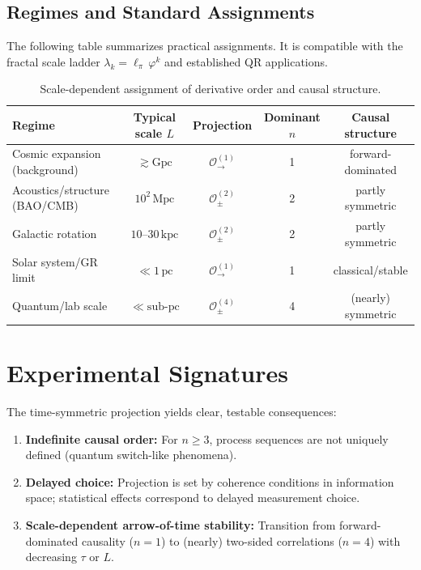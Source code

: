 \subsection{Regimes and Standard Assignments}
The following table summarizes practical assignments. It is compatible
with the fractal scale ladder \(\lambda_k=\ell_\pi\,\varphi^{k}\) and established QR applications.

\begin{table}[h]
\centering
\caption{Scale-dependent assignment of derivative order and causal structure.}
\label{tab:regimes}
\begin{tabular}{@{}lcccc@{}}
\toprule
Regime & Typical scale \(L\) & Projection & Dominant \(n\) & Causal structure \\
\midrule
Cosmic expansion (background) & \(\gtrsim \mathrm{Gpc}\) & \(\mathcal{O}^{(1)}_{\rightarrow}\) & 1 & forward-dominated \\
Acoustics/structure (BAO/CMB) & \(10^2\,\mathrm{Mpc}\) & \(\mathcal{O}^{(2)}_{\pm}\) & 2 & partly symmetric \\
Galactic rotation & \(10\text{–}30\,\mathrm{kpc}\) & \(\mathcal{O}^{(2)}_{\pm}\) & 2 & partly symmetric \\
Solar system/GR limit & \(\ll 1\,\mathrm{pc}\) & \(\mathcal{O}^{(1)}_{\rightarrow}\) & 1 & classical/stable \\
Quantum/lab scale & \(\ll \mathrm{sub\text{-}pc}\) & \(\mathcal{O}^{(4)}_{\pm}\) & 4 & (nearly) symmetric \\
\bottomrule
\end{tabular}
\end{table}

\section{Experimental Signatures}
The time-symmetric projection yields clear, testable consequences:
\begin{enumerate}
  \item \textbf{Indefinite causal order:} For \(n\ge 3\), process sequences are not
  uniquely defined (quantum switch-like phenomena).
  \item \textbf{Delayed choice:} Projection is set by coherence conditions in information space;
  statistical effects correspond to delayed measurement choice.
  \item \textbf{Scale-dependent arrow-of-time stability:} Transition from forward-dominated
  causality (\(n=1\)) to (nearly) two-sided correlations (\(n=4\)) with decreasing
  \(\tau\) or \(L\).
\end{enumerate}

